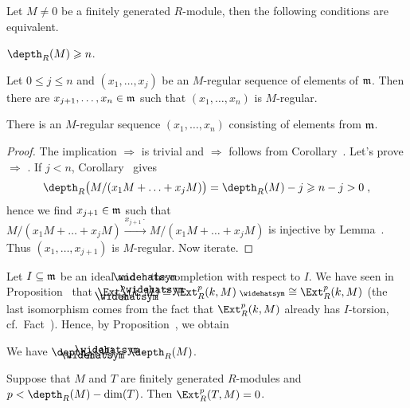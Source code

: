 \documentclass[a4paper,parskip=half,numbers=enddot, DIV=12]{scrreprt}
\renewcommand{\geq}{\geqslant}
\renewcommand{\leq}{\leqslant}
\begin{document}
\begin{prop}
	Let $M\neq 0$ be a finitely generated $R$-module, then the following conditions are equivalent.
	\begin{alphanumerate}
		\item $\depth_R(M)\geq n$.
		\item Let $0\leq j\leq n$ and $(x_1,\ldots,x_j)$ be an $M$-regular sequence of elements of $\mathfrak{m}$. Then there are $x_{j+1},\ldots,x_n\in\mathfrak{m}$ such that $(x_1,\ldots,x_n)$ is $M$-regular.
		\item There is an $M$-regular sequence $(x_1,\ldots,x_n)$ consisting of elements from $\mathfrak{m}$.
	\end{alphanumerate}
\end{prop}
\begin{proof}
	The implication  $\Rightarrow$   is trivial and  $\Rightarrow$  follows from Corollary~. Let's prove  $\Rightarrow$ . If $j<n$, Corollary~ gives
	\begin{align*}
		\depth_R\big(M/(x_1M+\ldots+x_jM)\big)=\depth_R(M)-j\geq n-j>0\;,
	\end{align*}
	hence we find $x_{j+1}\in\mathfrak{m}$ such that $M/(x_1M+\ldots+x_jM)\xrightarrow{x_{j+1}\cdot} M/(x_1M+\ldots+x_jM)$ is injective by Lemma~. Thus $(x_1,\ldots,x_{j+1})$ is $M$-regular. Now iterate.
\end{proof}
Let $I\subseteq \mathfrak{m}$ be an ideal and $\roof{\phantom{x}}$ the completion with respect to $I$. We have seen in Proposition~ that $\Ext_{\roof{R}}^p(k,\roof{M})\cong \Ext_R^p(k,M)^\complete \cong \Ext_R^p(k,M)$ (the last isomorphism comes from the fact that $\Ext_R^p(k,M)$ already has $I$-torsion, cf.\ Fact~). Hence, by Proposition~, we obtain
\begin{prop}
	We have $\depth_{\roof{R}}(\roof{M})=\depth_R(M)$.
\end{prop}
\begin{prop}[F.\ Ischebeck]
	Suppose that $M$ and $T$ are finitely generated $R$-modules and $p<\depth_R(M)-\dim(T)$. Then $\Ext_R^p(T,M)=0$.
\end{prop}
\end{document}
